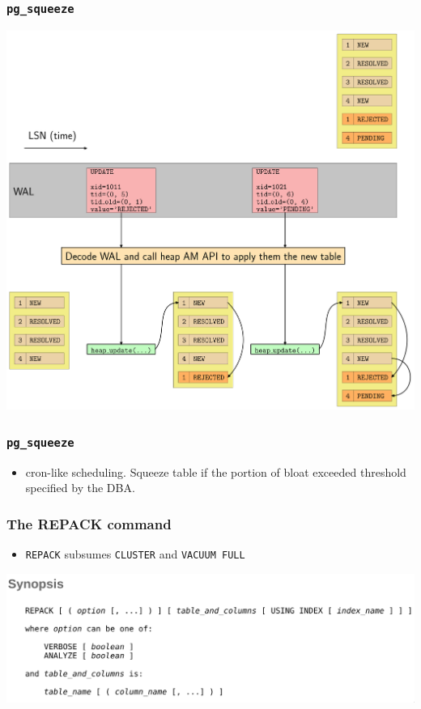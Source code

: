 \begin{frame}
  \frametitle{\texttt{pg\_squeeze}}
  \begin{center}
    \includegraphics[height=\sizeforimages\textheight]{images/pg_squeeze_03.png}
  \end{center}
\end{frame}

\begin{frame}
  \frametitle{\texttt{pg\_squeeze}}
  \begin{itemize}
    \item cron-like scheduling. Squeeze table if the portion of bloat exceeded
      threshold specified by the DBA.
  \end{itemize}
\end{frame}


\begin{frame}
  \frametitle{The REPACK command}
  \begin{itemize}
    \item \texttt{REPACK} subsumes \texttt{CLUSTER} and \texttt{VACUUM FULL}
  \end{itemize}
  \includegraphics[width=\textwidth]{repack.png}
\end{frame}

